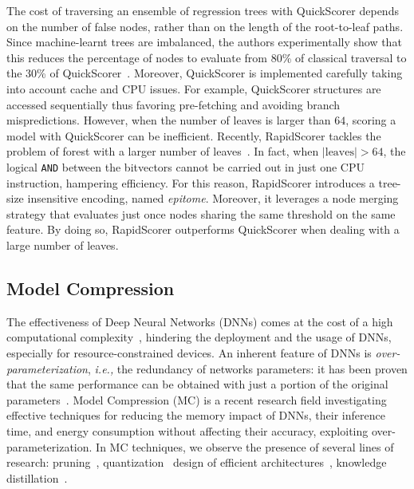 The cost of traversing an ensemble of regression trees with QuickScorer depends on the number of false nodes, rather than on the length of the root-to-leaf paths. Since machine-learnt trees are imbalanced, the authors experimentally show that this reduces the percentage of nodes to evaluate from 80\% of classical traversal to the 30\% of QuickScorer~\cite{lucchese2015quickscorer}. Moreover, QuickScorer is implemented carefully taking into account cache and CPU issues. For example, QuickScorer structures are accessed sequentially thus favoring pre-fetching and avoiding branch mispredictions. However, when the number of leaves is larger than $64$, scoring a model with QuickScorer can be inefficient. Recently, RapidScorer tackles the problem of forest with a larger number of leaves~\cite{ye2018rapidscorer}. In fact, when $|\text{leaves}| > 64$, the logical \texttt{AND} between the bitvectors cannot be carried out in just one CPU instruction, hampering efficiency. For this reason, RapidScorer introduces a tree-size insensitive encoding, named \emph{epitome}. Moreover, it leverages a node merging strategy that evaluates just once nodes sharing the same threshold on the same feature. By doing so, RapidScorer outperforms  QuickScorer when dealing with a large number of leaves.

\subsection{Model Compression}
\label{subsec:modelcompr}
The effectiveness of Deep Neural Networks (DNNs) comes at the cost of a high computational complexity~\cite{nnstats}, hindering the deployment and the usage of DNNs, especially for resource-constrained devices. An inherent feature of DNNs is \textit{over-parameterization}, \textit{i.e.,} the redundancy of networks parameters: it has been proven that the same performance can be obtained with just a portion of the original parameters~\cite{denil2013predicting}. Model Compression (MC) is a recent research field investigating effective techniques for reducing the memory impact of DNNs, their inference time, and energy consumption without affecting their accuracy, exploiting over-parameterization. 
In MC techniques, we observe the presence of several lines of research: pruning~\cite{DBLP:journals/corr/HanPTD15,DBLP:journals/corr/LiKDSG16, molchanov2019pruning,DBLP:journals/corr/HanMD15,DBLP:journals/corr/GuoYC16,yu2017scalpel,vieira2017learning,he2017channel,he2018amc}, quantization~\cite{DBLP:journals/corr/LiL16,DBLP:journals/corr/ZhuHMD16, DBLP:journals/corr/RastegariORF16,hubara2017quantized,Cai_2017_CVPR,DBLP:journals/corr/ZhouYGXC17} design of efficient architectures~\cite{DBLP:journals/corr/IandolaMAHDK16,zhang2018shufflenet,howard2017mobilenets,sandler2018mobilenetv2}, knowledge distillation~\cite{bucilua2006model,ba2014deep,DBLP:journals/corr/HintonVD15}. 

